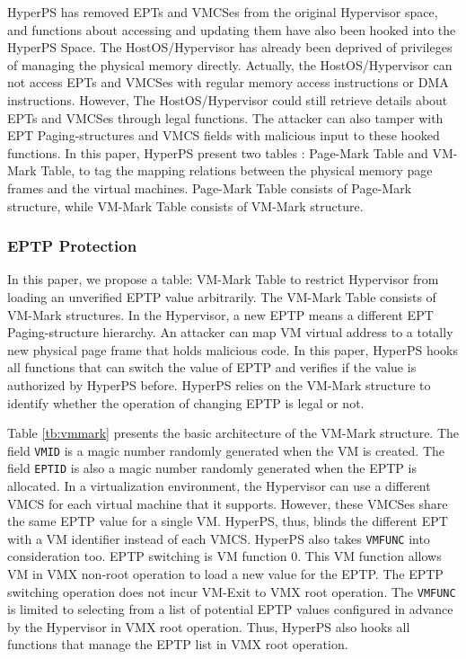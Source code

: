 HyperPS has removed EPTs and VMCSes from the original Hypervisor space, and functions about accessing and updating them have also been hooked into the HyperPS Space. 
The HostOS/Hypervisor has already been deprived of privileges of managing the physical memory directly. Actually, the HostOS/Hypervisor can not access EPTs and VMCSes with regular memory access instructions or DMA instructions. 
However, The HostOS/Hypervisor could still retrieve details about EPTs and VMCSes through legal functions. 
The attacker can also tamper with EPT Paging-structures and VMCS fields with malicious input to these hooked functions.
In this paper, HyperPS present two tables : Page-Mark Table and VM-Mark Table, to tag the mapping relations between the physical memory page frames and the virtual machines. Page-Mark Table consists of Page-Mark structure, while VM-Mark Table consists of VM-Mark structure.

\subsubsection{EPTP Protection}%
\label{ssub:eptp_protection}
In this paper, we propose a table: VM-Mark Table to restrict Hypervisor from loading an unverified EPTP value arbitrarily.
The VM-Mark Table consists of VM-Mark structures. 
In the Hypervisor, a new EPTP means a different EPT Paging-structure hierarchy. An attacker can map VM virtual address to a totally new physical page frame that holds malicious code. In this paper, HyperPS hooks all functions that can switch the value of EPTP and verifies if the value is authorized by HyperPS before. HyperPS relies on the VM-Mark structure to identify whether the operation of changing EPTP is legal or not. 

Table \ref{tb:vmmark} presents the basic architecture of the VM-Mark structure.
The field \verb|VMID| is a magic number randomly generated when the VM is created. 
The field \verb|EPTID| is also a magic number randomly generated when the EPTP is allocated.
In a virtualization environment,
the Hypervisor can use a different VMCS for each virtual machine that it supports. However, these VMCSes share the same EPTP value for a single VM. 
HyperPS, thus, blinds the different EPT with a VM identifier instead of each VMCS.
HyperPS also takes \verb|VMFUNC| into consideration too. EPTP switching is VM function 0. This VM function allows VM in VMX non-root operation to load a new value for the EPTP. The EPTP switching operation does not incur VM-Exit to VMX root operation.
The \verb|VMFUNC| is limited to selecting from a list of potential EPTP values configured in advance by the Hypervisor in VMX root operation. Thus, HyperPS also hooks all functions that manage the EPTP list in VMX root operation.

